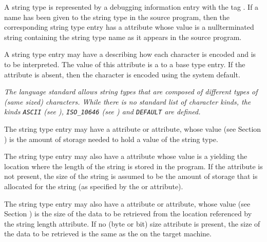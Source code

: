 A string type is represented by a debugging information entry
with the tag \DWTAGstringtypeTARG. 
If a name has been given to
the string type in the source program, then the corresponding
string type entry has a 
\DWATname{} attribute
whose value is
a null\dash terminated string containing the string type name as
it appears in the source program.

A string type entry may have a \DWATtype{} 
describing how each character is encoded and is to be interpreted.  
The value of this attribute is a \CLASSreference{} to a 
\DWTAGbasetype{} base type entry.  If the attribute is absent, 
then the character is encoded using the system default.

\textit{The 
 language standard allows string 
types that are composed of different types of (same sized) characters. 
While there is no standard list of character kinds, the kinds
\texttt{ASCII} (see \DWATEASCII), 
\texttt{ISO\_10646}
(see \DWATEUCS) and 
\texttt{DEFAULT}
are defined.}

The string type entry may have a 
\DWATbytesize{} attribute or 
\DWATbitsize{}
attribute, whose value 
(see Section ) 
is the amount of
storage needed to hold a value of the string type.

The 
\hypertarget{chap:DWATstringlengthstringlengthofstringtype}{}
string type entry may also have a 
\DWATstringlength{} attribute
whose 
value is a 
 yielding the location
where the length of the string is stored in the program.
If the \DWATstringlength{} attribute is not present, the size
of the string is assumed to be the amount of storage that is
allocated for the string (as specified by the \DWATbytesize{}
or \DWATbitsize{} attribute).

The string type entry may also have a 
\DWATstringlengthbytesizeNAME{}
attribute or
\DWATstringlengthbitsizeNAME{} attribute,
whose value (see Section ) 
is the size of the data to be retrieved from the location
referenced by the string length attribute. If no (byte or bit)
size attribute is present, the size of the data to be retrieved
is the same as the 
 on the target machine.

